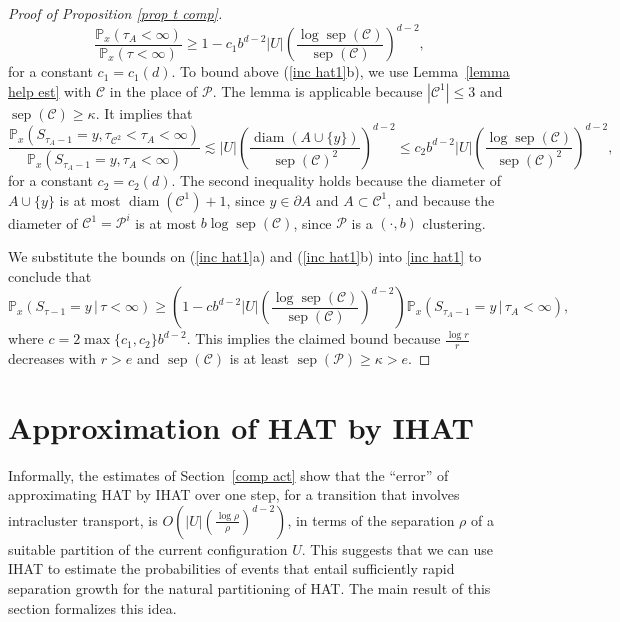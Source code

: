 \documentclass[11pt,reqno]{amsart}
\theoremstyle{definition}
\numberwithin{equation}{section}
\renewcommand{\P}{\mathbb{P}}
\newcommand{\1}{\mathbf{1}}
\newcommand{\bdy}{\partial}
\DeclareMathOperator{\diam}{diam}
\DeclareMathOperator{\sep}{sep}
\newcommand{\CC}{\mathcal{C}}
\begin{document}
\begin{proof}[Proof of Proposition \ref{prop t comp}]
\begin{equation*}
\frac{\P_{x} (\tau_A < \infty)}{\P_{x} (\tau < \infty)} \geq 1 - c_1 b^{d-2} |U| \left( \frac{\log \sep (\CC)}{\sep (\CC)} \right)^{d-2},
\end{equation*}
for a constant $c_1 = c_1 (d)$. 
To bound above (\ref{inc hat1}b), we use Lemma~\ref{lemma help est} with $\CC$ in the place of $\mathcal{P}$. The lemma is applicable because $|\CC^1| \leq 3$ and $\sep (\CC) \geq \kappa$. It implies that
\[
\frac{\P_{x} (S_{\tau_A-1} = y, \tau_{\CC^2} < \tau_A < \infty)}{\P_{x} (S_{\tau_A-1} =y, \tau_A < \infty)} \lesssim |U| \left( \frac{\diam(A \cup \{y\})}{\sep (\CC)^2} \right)^{d-2} \leq c_2 b^{d-2} |U| \left( \frac{\log \sep (\CC)}{\sep (\CC)^2} \right)^{d-2}, 
\]
for a constant $c_2 = c_2 (d)$. 
The second inequality holds because the diameter of $A \cup \{y\}$ is at most $\diam (\CC^1) + 1$, since $y \in \bdy A$ and $A \subset \CC^1$, and because the diameter of $\CC^1 = \mathcal{P}^i$ is at most $b \log \sep (\CC)$, since $\mathcal{P}$ is a $(\cdot,b)$ clustering. 


We substitute the bounds on (\ref{inc hat1}a) and (\ref{inc hat1}b) into \eqref{inc hat1} to conclude that
\[
\P_x (S_{\tau-1} = y \,\vert\, \tau < \infty) \geq \left(1 - c b^{d-2} |U| \left( \frac{\log \sep (\CC)}{\sep (\CC)} \right)^{d-2} \right) \P_x (S_{\tau_A-1} = y \,\vert\, \tau_A < \infty),
\] 
where $c = 2 \max\{c_1,c_2\} b^{d-2}$. This implies the claimed bound because $\frac{\log r}{r}$ decreases with $r > e$ and $\sep (\CC)$ is at least $\sep (\mathcal{P}) \geq \kappa > e$.

\end{proof}

\section{Approximation of HAT by IHAT}\label{sec comparison}

Informally, the estimates of Section~\ref{comp act} show that the ``error'' of approximating HAT by IHAT over one step, for a transition that involves intracluster transport, is $O( |U| (\frac{\log \rho}{\rho})^{d-2})$, in terms of the separation $\rho$ of a suitable partition of the current configuration $U$. This suggests that we can use IHAT to estimate the probabilities of events that entail sufficiently rapid separation growth for the natural partitioning of HAT. The main result of this section formalizes this idea.
\end{document}
